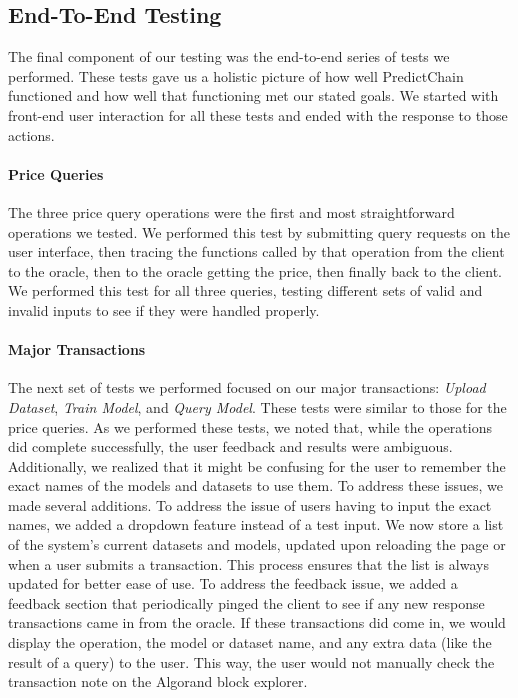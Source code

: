 \documentclass{ledger}
\begin{document}
\subsection{End-To-End Testing}

The final component of our testing was the end-to-end series of tests we performed. These tests gave us a holistic picture of how well PredictChain functioned and how well that functioning met our stated goals.
We started with front-end user interaction for all these tests and ended with the response to those actions.

\paragraph{Price Queries}
The three price query operations were the first and most straightforward operations we tested.
We performed this test by submitting query requests on the user interface, then tracing the functions called by that operation from the client to the oracle, then to the oracle getting the price, then finally back to the client. We performed this test for all three queries, testing different sets of valid and invalid inputs to see if they were handled properly.

\paragraph{Major Transactions}
The next set of tests we performed focused on our major transactions: \textit{Upload Dataset}, \textit{Train Model}, and \textit{Query Model}. These tests were similar to those for the price queries. As we performed these tests, we noted that, while the operations did complete successfully, the user feedback and results were ambiguous. Additionally, we realized that it might be confusing for the user to remember the exact names of the models and datasets to use them. To address these issues, we made several additions. To address the issue of users having to input the exact names, we added a dropdown feature instead of a test input. We now store a list of the system's current datasets and models, updated upon reloading the page or when a user submits a transaction. This process ensures that the list is always updated for better ease of use. To address the feedback issue, we added a feedback section that periodically pinged the client to see if any new response transactions came in from the oracle. If these transactions did come in, we would display the operation, the model or dataset name, and any extra data (like the result of a query) to the user. This way, the user would not manually check the transaction note on the Algorand block explorer.
\end{document}

